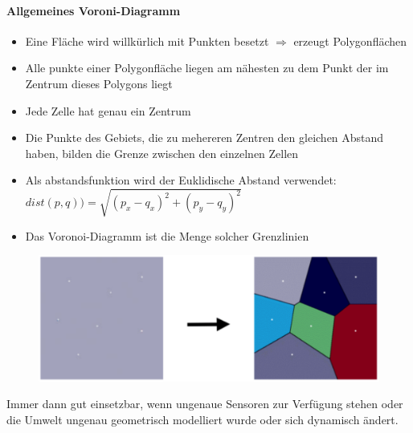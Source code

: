 \paragraph{Allgemeines Voroni-Diagramm}
\begin{itemize}
	\item Eine Fläche wird willkürlich mit Punkten besetzt $\Rightarrow$ erzeugt Polygonflächen
	\item Alle punkte einer Polygonfläche liegen am nähesten zu dem Punkt der im Zentrum dieses Polygons liegt
	\item Jede Zelle hat genau ein Zentrum
	\item Die Punkte des Gebiets, die zu mehereren Zentren den gleichen Abstand haben, bilden die Grenze zwischen den einzelnen Zellen
	\item Als abstandsfunktion wird der Euklidische Abstand verwendet:
	\subitem $dist(p,q) ) = \sqrt{(p_x-q_x)^2 + (p_y-q_y)^2}$
	\item Das Voronoi-Diagramm ist die Menge solcher Grenzlinien
\end{itemize}
\begin{figure}[H]
	\begin{center}
		\includegraphics[scale=0.4]{Resources/PNG/Polygon.PNG}
		\caption{}
		\label{fig:PNG/Polygon.PNG}
	\end{center}
\end{figure}
Immer dann gut einsetzbar, wenn ungenaue Sensoren zur Verfügung stehen oder die Umwelt ungenau geometrisch modelliert wurde oder sich dynamisch ändert.
